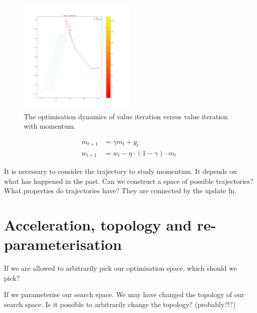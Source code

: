 \begin{figure}
\centering
\includegraphics[width=0.5\textwidth,height=0.5\textheight]{../../pictures/figures/vi_sgd-vs-vi_mom.png}
\caption{The optimisation dynamics of value iteration versus value iteration with momentum.}
\end{figure}




\begin{align}
m_{t+1} &= \gamma m_t + g_t \\
w_{t+1} &= w_t - \eta \cdot (1-\gamma) \cdot m_t
\end{align}

It is necessary to consider the trajectory to study momentum. It depends
on what has happened in the past. Can we construct a space of possible
trajectories? What properties do trajectories have? They are connected
by the update fn.

%


\section{Acceleration, topology and re-parameterisation}

If we are allowed to arbitrarily pick our optimisation space, which should we pick?

If we parameterise our search space. We may have changed the topology of our search space.
Is it possible to arbitrarily change the topology? (probably?!?)

